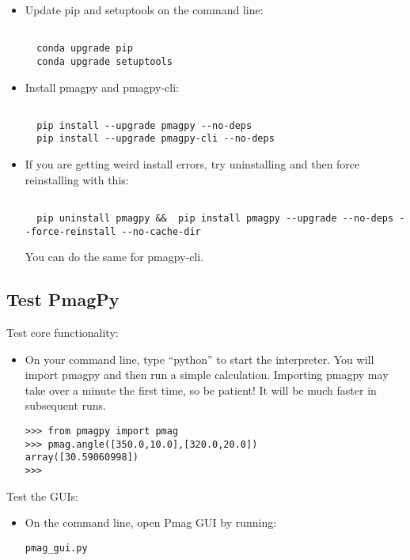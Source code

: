 \documentclass[11pt]{article}
\begin{document}
\begin{itemize}
     \item Update pip and setuptools on the command line:

\begin{verbatim}

  conda upgrade pip
  conda upgrade setuptools
\end{verbatim}
\item Install pmagpy and pmagpy-cli:

\begin{verbatim}

  pip install --upgrade pmagpy --no-deps
  pip install --upgrade pmagpy-cli --no-deps
\end{verbatim}
     \item If you are getting weird install errors, try uninstalling and then force reinstalling with this:

\begin{verbatim}

  pip uninstall pmagpy &&  pip install pmagpy --upgrade --no-deps --force-reinstall --no-cache-dir
\end{verbatim}

You can do the same for pmagpy-cli.
   \end{itemize}


\subsection{Test PmagPy}

Test core functionality:

\begin{itemize}
  \item On your command line, type ``python'' to start the interpreter.  You will import pmagpy and then run a simple calculation.  Importing pmagpy may take over a minute the first time, so be patient!  It will be much faster in subsequent runs.

\begin{verbatim}
>>> from pmagpy import pmag
>>> pmag.angle([350.0,10.0],[320.0,20.0])
array([30.59060998])
>>>
\end{verbatim}

\end{itemize}

Test the GUIs:

\begin{itemize}
\item  On the command line, open Pmag GUI by running:

\begin{verbatim}
pmag_gui.py
\end{verbatim}

\end{itemize}
\end{document}
